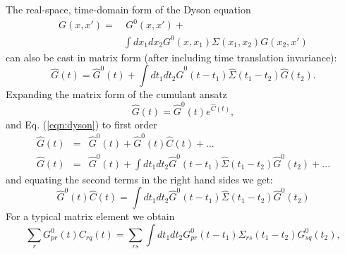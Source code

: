 \documentclass[aps,prb,preprint,groupaddress,floatfix]{revtex4}
\begin{document}
The real-space, time-domain form of the Dyson equation
\begin{equation}
\begin{split}
G(x,x') =&~ G^0(x,x') + \\
&\int dx_1 dx_2 G^0(x,x_1) \Sigma(x_1,x_2) G(x_2,x')
\end{split}
\end{equation}
can also be cast in matrix form (after including time translation invariance):
\begin{equation}
\label{eqn:dyson}
\hat{G}(t) = \hat{G}^0(t) + \int dt_1 dt_2 \hat{G}^0(t-t_1)
\hat{\Sigma}(t_1-t_2) \hat{G}(t_2).
\end{equation}
Expanding the matrix form of the cumulant ansatz
\begin{equation}
\label{eqn:cummat}
\hat{G}(t) = \hat{G}^0(t)e^{\hat{C}(t)},
\end{equation}
and Eq. (\ref{eqn:dyson}) to first order
\begin{eqnarray}
\hat{G}(t) &=& \hat{G}^0(t) + \hat{G}^0(t)\hat{C}(t) + ... \\
\hat{G}(t) &=& \hat{G}^0(t) + \int dt_1 dt_2 \hat{G}^0(t-t_1)
\hat{\Sigma}(t_1-t_2) \hat{G}^0(t_2) + ...
\end{eqnarray}
and equating the second terms in the right hand sides we get:
\begin{equation}
\hat{G}^0(t)\hat{C}(t) = \int dt_1 dt_2 \hat{G}^0(t-t_1)
\hat{\Sigma}(t_1-t_2) \hat{G}^0(t_2)
\end{equation}
For a typical matrix element we obtain
\begin{equation}
\sum_r G^0_{pr}(t) C_{rq}(t) = \sum_{rs} \int dt_1 dt_2 G^0_{pr}(t-t_1)
\Sigma_{rs}(t_1-t_2) G^0_{sq}(t_2),
\end{equation}
\end{document}
